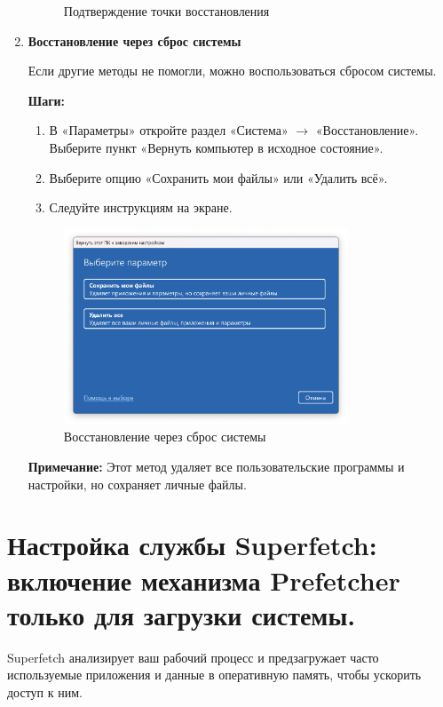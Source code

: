 \documentclass[a4paper, 14pt]{report}
\begin{document}
\begin{enumerate}
{\begin{enumerate}
{\begin{figure}[H]
                        \caption{Подтверждение точки восстановления}
                    \end{figure}
                    }
          \end{enumerate}
          }
    \item{\textbf{Восстановление через сброс системы}

          Если другие методы не помогли, можно воспользоваться сбросом системы.

          \textbf{Шаги:}
          \begin{enumerate}
              \item В «Параметры» откройте раздел «Система» $\rightarrow$ «Восстановление». Выберите пункт «Вернуть компьютер в исходное состояние».
              \item Выберите опцию «Сохранить мои файлы» или «Удалить всё».
              \item Следуйте инструкциям на экране.
          \end{enumerate}
          \begin{figure}[H]
              \centering
              \includegraphics[width=0.8\textwidth]{../images/reset-system.png}
              \caption{Восстановление через сброс системы}
          \end{figure}
          \textbf{Примечание:}  Этот метод удаляет все пользовательские программы и настройки, но сохраняет личные файлы.
          }
\end{enumerate}
\section{Настройка службы Superfetch: включение механизма Prefetcher только для загрузки системы.}

Superfetch анализирует ваш рабочий процесс и предзагружает часто используемые приложения и данные в оперативную память, чтобы ускорить доступ к ним.
\end{document}
